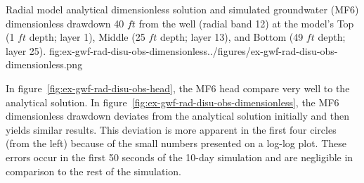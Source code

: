 \begin{StandardFigure}{
                                     Radial model analytical dimensionless solution \citep{neuman1974effect} and simulated groundwater (MF6) dimensionless drawdown 40 $ft$ from the well (radial band 12)
                                     at the model’s Top (1 $ft$ depth; layer 1), Middle (25 $ft$ depth; layer 13), and Bottom (49 $ft$ depth; layer 25).
                                     }{fig:ex-gwf-rad-disu-obs-dimensionless}{../figures/ex-gwf-rad-disu-obs-dimensionless.png}
\end{StandardFigure}                                 

In figure~\ref{fig:ex-gwf-rad-disu-obs-head}, the MF6 head compare very well to the analytical solution. In figure~\ref{fig:ex-gwf-rad-disu-obs-dimensionless}, the MF6 dimensionless drawdown deviates from the analytical solution initially and then yields similar results. This deviation is more apparent in the first four circles (from the left) because of the small numbers presented on a log-log plot. These errors occur in the first 50 seconds of the 10-day simulation and are negligible in comparison to the rest of the simulation.
